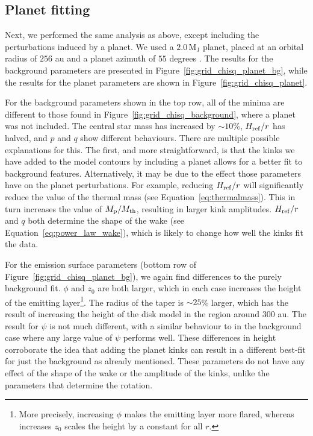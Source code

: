 \subsection{Planet fitting}

Next, we performed the same analysis as above, except including the perturbations induced by a planet.
We used a $2.0 \, \mathrm{M_J}$ planet, placed at an orbital radius of $256$ au and a planet azimuth of $55$ degrees \citep{pinte2018a,calcino2022}.
The results for the background parameters are presented in Figure~\ref{fig:grid_chisq_planet_bg}, while the results for the planet parameters are shown in Figure~\ref{fig:grid_chisq_planet}.

For the background parameters shown in the top row, all of the minima are different to those found in Figure~\ref{fig:grid_chisq_background}, where a planet was not included. The central star mass has increased by $\sim10$\%, $H_{\rm ref}/r$ has halved, and $p$ and $q$ show different behaviours.
There are multiple possible explanations for this.
The first, and more straightforward, is that the kinks we have added to the model contours by including a planet allows for a better fit to background features.
Alternatively, it may be due to the effect those parameters have on the planet perturbations.
For example, reducing $H_{\rm ref}/r$ will significantly reduce the value of the thermal mass (see Equation~\ref{eq:thermalmass}).
This in turn increases the value of $M_{\rm p} / M_{\rm th}$, resulting in larger kink amplitudes.
$H_{\rm ref}/r$ and $q$ both determine the shape of the wake (see Equation~\ref{eq:power_law_wake}), which is likely to change how well the kinks fit the data.

For the emission surface parameters (bottom row of Figure~\ref{fig:grid_chisq_planet_bg}), we again find differences to the purely background fit.
$\phi$ and $z_0$ are both larger, which in each case increases the height of the emitting layer\footnote{More precisely, increasing $\phi$ makes the emitting layer more flared, whereas increases $z_0$ scales the height by a constant for all $r$.}.
The radius of the taper is $\sim 25$\% larger, which has the result of increasing the height of the disk model in the region around $300$ au.
The result for $\psi$ is not much different, with a similar behaviour to in the background case where any large value of $\psi$ performs well.
These differences in height corroborate the idea that adding the planet kinks can result in a different best-fit for just the background as already mentioned.
These parameters do not have any effect of the shape of the wake or the amplitude of the kinks, unlike the parameters that determine the rotation.

